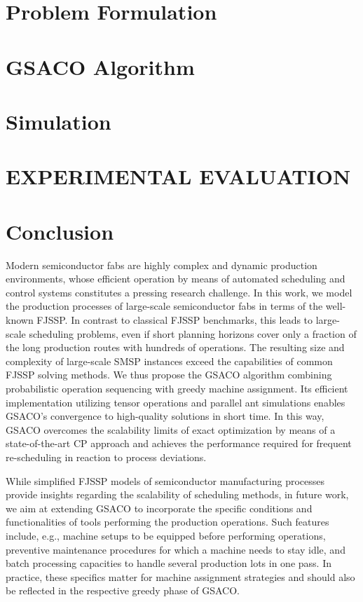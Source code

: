\documentclass[runningheads]{llncs}
\begin{document}
\section{Problem Formulation}
\label{sec:problem_f}


\section{GSACO Algorithm}
\label{sec:gsaco}


\section{Simulation}
\label{sec:sim}


\section{\uppercase{Experimental Evaluation}}
\label{sec:results}



\section{Conclusion}
\label{sec:conclusion}

Modern semiconductor fabs are highly complex and dynamic production
environments, whose efficient operation by means of automated scheduling
and control systems constitutes a pressing research challenge.
In this work, we model the production processes of large-scale
semiconductor fabs in terms of the well-known FJSSP.
In contrast to classical FJSSP benchmarks,
this leads to large-scale scheduling problems,
even if short planning horizons cover only a fraction of the long
production routes with hundreds of operations.
The resulting size and complexity of large-scale SMSP instances
exceed the capabilities of common FJSSP solving methods.
We thus propose the GSACO algorithm combining probabilistic
operation sequencing with greedy machine assignment.
Its efficient implementation utilizing tensor operations and
parallel ant simulations enables GSACO's convergence to high-quality
solutions in short time.
In this way, GSACO overcomes the scalability limits of
exact optimization by means of a state-of-the-art CP approach
and achieves the performance required for frequent re-scheduling
in reaction to process deviations. %


While simplified FJSSP models of semiconductor manufacturing processes
provide insights regarding the scalability of scheduling methods,
in future work, we aim at extending GSACO to incorporate the specific
conditions and functionalities of tools performing the production operations.
Such features include, e.g.,
machine setups to be equipped before performing operations,
preventive maintenance procedures for which a machine needs to stay idle, and
batch processing capacities to handle several production lots in one pass.
In practice, these specifics matter for machine assignment strategies
and should also be reflected in the respective greedy phase of GSACO.
\end{document}
